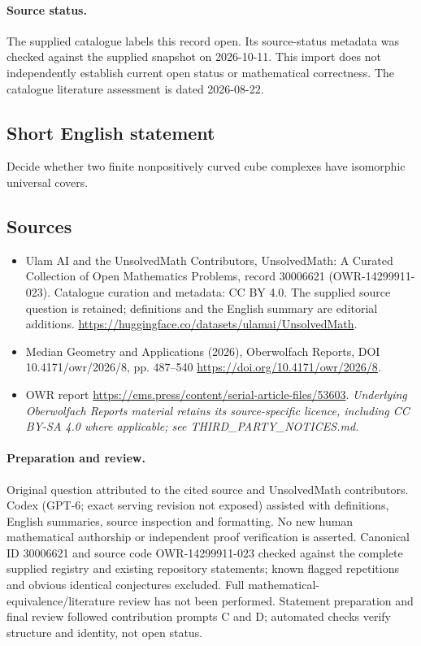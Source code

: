 \documentclass[11pt]{article}
\begin{document}
\paragraph{Source status.}
The supplied catalogue labels this record open. Its source-status metadata was checked against the supplied snapshot on 2026-10-11. This import does not independently establish current open status or mathematical correctness. The catalogue literature assessment is dated 2026-08-22.
\subsection{Short English statement}
Decide whether two finite nonpositively curved cube complexes have isomorphic universal covers.
\subsection{Sources}
\begin{itemize}
\item[S1] Ulam AI and the UnsolvedMath Contributors, UnsolvedMath: A Curated Collection of Open Mathematics Problems, record 30006621 (OWR-14299911-023). Catalogue curation and metadata: CC BY 4.0. The supplied source question is retained; definitions and the English summary are editorial additions.
\url{https://huggingface.co/datasets/ulamai/UnsolvedMath}.
\item[S2] Median Geometry and Applications (2026), Oberwolfach Reports, DOI 10.4171/owr/2026/8, pp. 487--540
\url{https://doi.org/10.4171/owr/2026/8}.
\item[S3] OWR report
\url{https://ems.press/content/serial-article-files/53603}.
\textit{Underlying Oberwolfach Reports material retains its source-specific licence, including CC BY-SA 4.0 where applicable; see THIRD\_PARTY\_NOTICES.md.}
\end{itemize}
\paragraph{Preparation and review.}
Original question attributed to the cited source and UnsolvedMath contributors. Codex (GPT-6; exact serving revision not exposed) assisted with definitions, English summaries, source inspection and formatting. No new human mathematical authorship or independent proof verification is asserted. Canonical ID 30006621 and source code OWR-14299911-023 checked against the complete supplied registry and existing repository statements; known flagged repetitions and obvious identical conjectures excluded. Full mathematical-equivalence/literature review has not been performed. Statement preparation and final review followed contribution prompts C and D; automated checks verify structure and identity, not open status.
\label{end:30006621}
\end{document}
